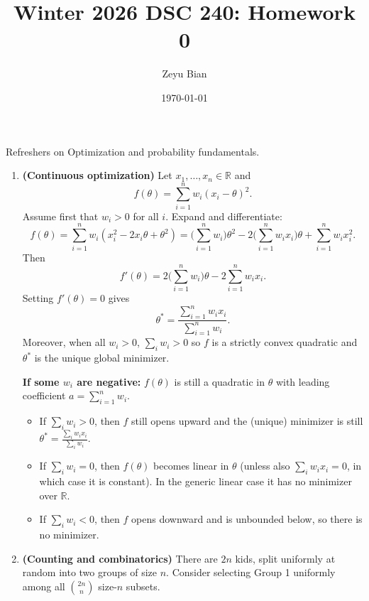\documentclass[en,hazy,blue,12pt,normal]{elegantnote}
\title{Winter 2026 DSC 240: Homework 0}
\author{Zeyu Bian}
\date{\today}
\begin{document}
\maketitle

\begin{homework}
 Refreshers on Optimization and probability fundamentals.
\end{homework}

\begin{enumerate}[label=\textbf{(\alph*)}, leftmargin=2.2em]

\item \textbf{(Continuous optimization)}
Let $x_1,\dots,x_n \in \mathbb{R}$ and
\[
f(\theta)=\sum_{i=1}^n w_i(x_i-\theta)^2.
\]
Assume first that $w_i>0$ for all $i$. Expand and differentiate:
\[
f(\theta)=\sum_{i=1}^n w_i(x_i^2-2x_i\theta+\theta^2)
= \Big(\sum_{i=1}^n w_i\Big)\theta^2 - 2\Big(\sum_{i=1}^n w_i x_i\Big)\theta + \sum_{i=1}^n w_i x_i^2.
\]
Then
\[
f'(\theta)=2\Big(\sum_{i=1}^n w_i\Big)\theta - 2\sum_{i=1}^n w_i x_i.
\]
Setting $f'(\theta)=0$ gives
\[
\theta^\ast=\frac{\sum_{i=1}^n w_i x_i}{\sum_{i=1}^n w_i}.
\]
Moreover, when all $w_i>0$, $\sum_i w_i>0$ so $f$ is a strictly convex quadratic and $\theta^\ast$ is the unique global minimizer.

\medskip
\noindent \textbf{If some $w_i$ are negative:}
$f(\theta)$ is still a quadratic in $\theta$ with leading coefficient $a=\sum_{i=1}^n w_i$.
\begin{itemize}
  \item If $\sum_i w_i>0$, then $f$ still opens upward and the (unique) minimizer is still
  $\displaystyle \theta^\ast=\frac{\sum_i w_i x_i}{\sum_i w_i}$.
  \item If $\sum_i w_i=0$, then $f(\theta)$ becomes linear in $\theta$ (unless also $\sum_i w_i x_i=0$, in which case it is constant). In the generic linear case it has no minimizer over $\mathbb{R}$.
  \item If $\sum_i w_i<0$, then $f$ opens downward and is unbounded below, so there is no minimizer.
\end{itemize}

\item \textbf{(Counting and combinatorics)}
There are $2n$ kids, split uniformly at random into two groups of size $n$. Consider selecting Group 1 uniformly among all $\binom{2n}{n}$ size-$n$ subsets.


\end{enumerate}
\end{document}
